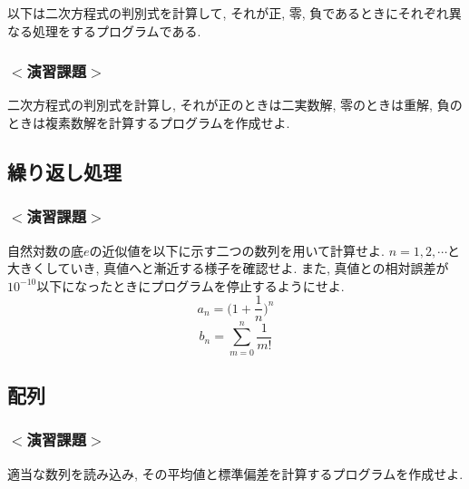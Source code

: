 \documentclass[a4j]{jsarticle}
\begin{document}
以下は二次方程式の判別式を計算して, それが正, 零, 負であるときにそれぞれ異なる処理をするプログラムである. 


\subsubsection*{$<$演習課題$>$}
二次方程式の判別式を計算し, それが正のときは二実数解, 
零のときは重解, 負のときは複素数解を計算するプログラムを作成せよ. 

\subsection{繰り返し処理}



\subsubsection*{$<$演習課題$>$}
自然対数の底$e$の近似値を以下に示す二つの数列を用いて計算せよ. 
$n=1, 2, \cdots$と大きくしていき, 真値へと漸近する様子を確認せよ.
また, 真値との相対誤差が$10^{-10}$以下になったときにプログラムを停止するようにせよ. 
\begin{equation}
a_n= \Big( 1+\frac{1}{n}\Big)^n
\end{equation}
\begin{equation}
b_n=\sum_{m=0}^{n}\frac{1}{m!}
\end{equation}



\subsection{配列}




\subsubsection*{$<$演習課題$>$}
適当な数列を読み込み, その平均値と標準偏差を計算するプログラムを作成せよ. 
\end{document}
